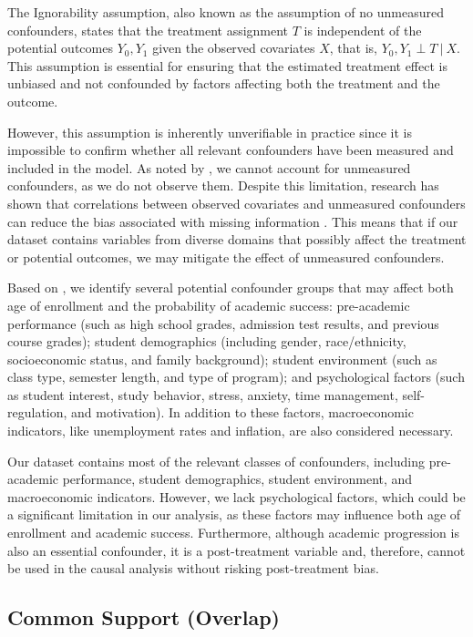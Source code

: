\documentclass{article}
\begin{document}
The Ignorability assumption, also known as the assumption of no unmeasured confounders, states that the treatment assignment \( T \) is independent of the potential outcomes \( Y_0, Y_1 \) given the observed covariates \( X \), that is, \( Y_0, Y_1 \perp T \ | \ X \). This assumption is essential for ensuring that the estimated treatment effect is unbiased and not confounded by factors affecting both the treatment and the outcome.

However, this assumption is inherently unverifiable in practice since it is impossible to confirm whether all relevant confounders have been measured and included in the model. As noted by \citet{hernan2006estimating}, we cannot account for unmeasured confounders, as we do not observe them. Despite this limitation, research has shown that correlations between observed covariates and unmeasured confounders can reduce the bias associated with missing information \citep{schulz2023no}. This means that if our dataset contains variables from diverse domains that possibly affect the treatment or potential outcomes, we may mitigate the effect of unmeasured confounders.

Based on \citet{alyahyan2020predicting}, we identify several potential confounder groups that may affect both age of enrollment and the probability of academic success: pre-academic performance (such as high school grades, admission test results, and previous course grades); student demographics (including gender, race/ethnicity, socioeconomic status, and family background); student environment (such as class type, semester length, and type of program); and psychological factors (such as student interest, study behavior, stress, anxiety, time management, self-regulation, and motivation). In addition to these factors, macroeconomic indicators, like unemployment rates and inflation, are also considered necessary.

Our dataset contains most of the relevant classes of confounders, including pre-academic performance, student demographics, student environment, and macroeconomic indicators. However, we lack psychological factors, which could be a significant limitation in our analysis, as these factors may influence both age of enrollment and academic success. Furthermore, although academic progression is also an essential confounder, it is a post-treatment variable and, therefore, cannot be used in the causal analysis without risking post-treatment bias.

\subsection{Common Support (Overlap)}
\end{document}

